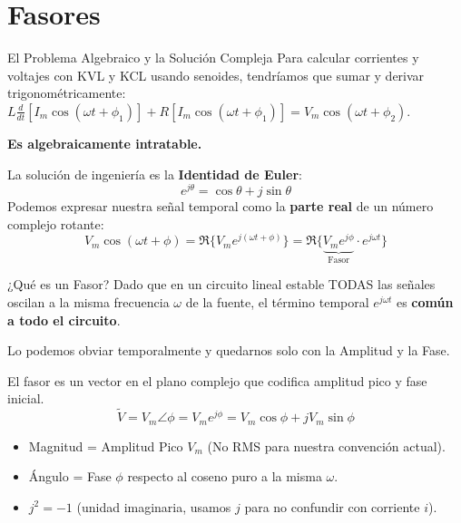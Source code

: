 \documentclass[aspectratio=169, 10pt]{beamer}
\begin{document}
\section{Fasores}
\begin{frame}{El Problema Algebraico y la Solución Compleja}
    Para calcular corrientes y voltajes con KVL y KCL usando senoides, tendríamos que sumar y derivar trigonométricamente: 
    $L \frac{d}{dt}[I_m \cos(\omega t + \phi_1)] + R[I_m \cos(\omega t + \phi_1)] = V_m \cos(\omega t + \phi_2)$.
    
    \vspace{0.2cm}
    \textbf{Es algebraicamente intratable.} 
    \vspace{0.2cm}
    
    La solución de ingeniería es la \textbf{Identidad de Euler}:
    $$ e^{j\theta} = \cos\theta + j\sin\theta $$
    Podemos expresar nuestra señal temporal como la \textbf{parte real} de un número complejo rotante:
    $$ V_m \cos(\omega t + \phi) = \Re\{ V_m e^{j(\omega t + \phi)} \} = \Re\{ \underbrace{V_m e^{j\phi}}_{\text{Fasor}} \cdot e^{j\omega t} \} $$
\end{frame}

\begin{frame}{¿Qué es un Fasor?}
    Dado que en un circuito lineal estable TODAS las señales oscilan a la misma frecuencia $\omega$ de la fuente, el término temporal $e^{j\omega t}$ es \textbf{común a todo el circuito}. 
    
    \vspace{0.2cm}
    Lo podemos obviar temporalmente y quedarnos solo con la Amplitud y la Fase. 
    
    \begin{tcolorbox}[colback=white, colframe=ucbblue, title=\textbf{Definición del Fasor (Convención Pico)}]
        El fasor es un vector en el plano complejo que codifica amplitud pico y fase inicial.
        $$ \tilde{V} = V_m \angle \phi = V_m e^{j\phi} = V_m \cos\phi + j V_m \sin\phi $$
    \end{tcolorbox}
    \begin{itemize}
        \item Magnitud = Amplitud Pico $V_m$ (No RMS para nuestra convención actual).
        \item Ángulo = Fase $\phi$ respecto al coseno puro a la misma $\omega$.
        \item $j^2 = -1$ (unidad imaginaria, usamos $j$ para no confundir con corriente $i$).
    \end{itemize}
\end{frame}
\end{document}
